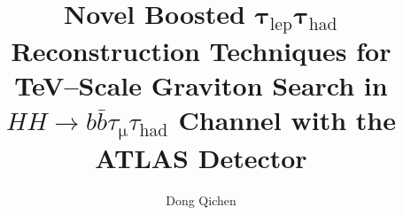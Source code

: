 \title{
    Novel Boosted $\mathbf{\tau}_\mathrm{lep}\mathbf{\tau}_\mathrm{had}$ Reconstruction Techniques for 
    TeV--Scale Graviton Search in $HH\rightarrow{b}{\bar{b}}{\tau}_\mathrm{\mu}{\tau}_\mathrm{had}$ Channel with the ATLAS Detector}



\author{Dong Qichen}








